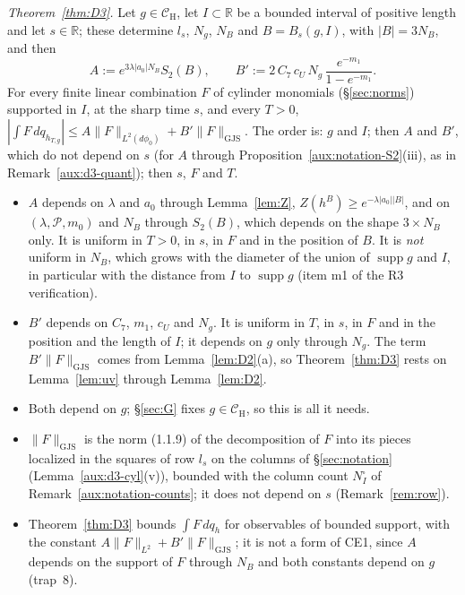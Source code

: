 \documentclass[11pt,a4paper]{article}
\theoremstyle{plain}
\theoremstyle{definition}
\theoremstyle{plain}
\theoremstyle{definition}
\newcommand{\R}{\mathbb{R}}
\newcommand{\CH}{\mathcal{C}_{\mathrm H}}
\DeclareMathOperator{\supp}{supp}
\newcommand{\GJS}[1]{\lVert #1\rVert_{\mathrm{GJS}}}   %
\begin{document}
\emph{Theorem~\ref{thm:D3}.} Let $g\in\CH$, let $I\subset\R$ be a bounded interval of positive
length and let $s\in\R$; these determine $l_s$, $N_g$, $N_B$ and $B=B_s(g,I)$, with $|B|=3N_B$, and then
\[
 A:=e^{3\lambda|a_0|N_B}S_2(B),\qquad
 B':=2\,C_7\,c_U\,N_g\,\frac{e^{-m_1}}{1-e^{-m_1}} .
\]
For every finite linear combination $F$ of cylinder monomials (\S\ref{sec:norms}) supported in
$I$, at the sharp time $s$, and every $T>0$,
$|\int F\,dq_{h_{T,g}}|\le A\|F\|_{L^2(d\phi_0)}+B'\GJS F$. The order is: $g$ and $I$; then
$A$ and $B'$, which do not depend on $s$ (for $A$ through Proposition~\ref{aux:notation-S2}(iii),
as in Remark~\ref{aux:d3-quant}); then $s$, $F$ and $T$.
\begin{itemize}
\item $A$ depends on $\lambda$ and $a_0$ through Lemma~\ref{lem:Z},
$Z(h^B)\ge e^{-\lambda|a_0||B|}$, and on
$(\lambda,\mathscr P,m_0)$ and $N_B$ through $S_2(B)$, which depends
on the shape $3\times N_B$ only. It is uniform in $T>0$, in $s$, in
$F$ and in the position of $B$. It is \emph{not} uniform in $N_B$, which grows with the
diameter of the union of $\supp g$ and $I$, in particular with the distance from $I$ to
$\supp g$ (item m1 of the R3 verification).
\item $B'$ depends on $C_7$, $m_1$, $c_U$ and $N_g$. It is uniform in $T$, in $s$, in $F$
and in the position and the length of $I$; it depends on $g$ only through $N_g$.  The term
$B'\GJS F$ comes from Lemma~\ref{lem:D2}(a), so Theorem~\ref{thm:D3} rests on
Lemma~\ref{lem:uv} through Lemma~\ref{lem:D2}.
\item Both depend on $g$; \S\ref{sec:G} fixes $g\in\CH$, so this is all it needs.
\item $\GJS F$ is the norm (1.1.9) of the decomposition of $F$ into its pieces localized in
the squares of row $l_s$ on the columns of \S\ref{sec:notation}
(Lemma~\ref{aux:d3-cyl}(v)), bounded with the column count $N^\square_I$ of
Remark~\ref{aux:notation-counts}; it does not depend on $s$ (Remark~\ref{rem:row}).
\item Theorem~\ref{thm:D3} bounds $\int F\,dq_h$ for observables of bounded support, with
the constant $A\|F\|_{L^2}+B'\GJS F$; it is not a form of CE1, since $A$ depends on the
support of $F$ through $N_B$ and both constants depend on $g$ (trap~8).
\end{itemize}
\end{document}
